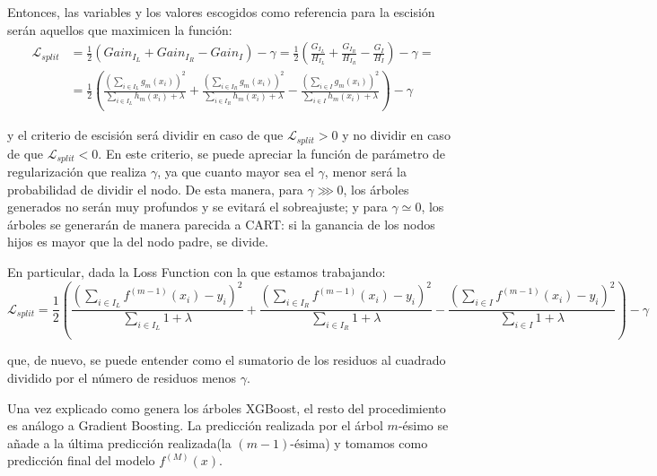 \documentclass[12pt,twoside]{article}
\begin{document}
Entonces, las variables y los valores escogidos como referencia para la escisión serán aquellos que maximicen la función:
\begin{equation*}
\begin{split}
\mathcal{L}_{split} &= \frac{1}{2} \left( Gain_{I_L} + Gain_{I_R} - Gain_{I} \right) - \gamma = \frac{1}{2} \left( \frac{G_{I_L}}{H_{I_L}} + \frac{G_{I_R}}{H_{I_R}} - \frac{G_I}{H_I} \right) - \gamma = \\
&= \frac{1}{2} \left( \frac{\left( \sum_{i \in I_L} g_m(x_i) \right)^2}{\sum_{i \in I_L} h_m(x_i) + \lambda} + \frac{\left( \sum_{i \in I_R} g_m(x_i) \right)^2}{\sum_{i \in I_R} h_m(x_i) + \lambda} - \frac{\left( \sum_{i \in I} g_m(x_i) \right)^2}{\sum_{i \in I} h_m(x_i) + \lambda} \right)   - \gamma
\end{split}
\end{equation*}

\noindent
y el criterio de escisión será dividir en caso de que $\mathcal{L}_{split} > 0$ y no dividir en caso de que $\mathcal{L}_{split} < 0$. En este criterio, se puede apreciar la función de parámetro de regularización que realiza $\gamma$, ya que cuanto mayor sea el $\gamma$, menor será la probabilidad de dividir el nodo. De esta manera, para $\gamma \ggg 0$, los árboles generados no serán muy profundos y se evitará el sobreajuste; y para $\gamma \simeq 0$, los árboles se generarán de manera parecida a CART: si la ganancia de los nodos hijos es mayor que la del nodo padre, se divide.

En particular, dada la Loss Function con la que estamos trabajando:
\begin{equation*}
\mathcal{L}_{split} = \frac{1}{2} \left( \frac{\left( \sum_{i \in I_L} f^{(m-1)}(x_i) - y_i \right)^2}{\sum_{i \in I_L} 1 + \lambda} + \frac{\left( \sum_{i \in I_R} f^{(m-1)}(x_i) - y_i \right)^2}{\sum_{i \in I_R} 1 + \lambda} - \frac{\left( \sum_{i \in I} f^{(m-1)}(x_i) - y_i \right)^2}{\sum_{i \in I} 1 + \lambda} \right)   - \gamma
\end{equation*}

\noindent
que, de nuevo, se puede entender como el sumatorio de los residuos al cuadrado dividido por el número de residuos menos $\gamma$.

Una vez explicado como genera los árboles XGBoost, el resto del procedimiento es análogo a Gradient Boosting. La predicción realizada por el árbol $m$-ésimo se añade a la última predicción realizada(la $(m-1)$-ésima) y tomamos como predicción final del modelo $f^{(M)}(x)$.
\end{document}
